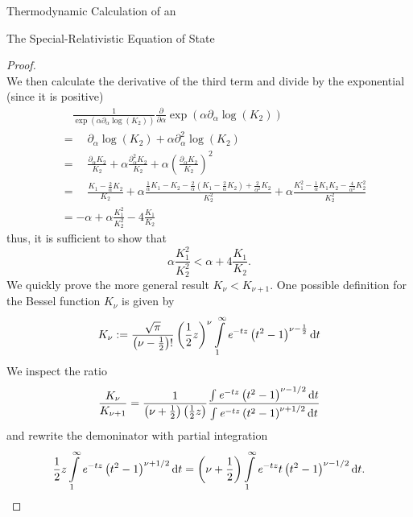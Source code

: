 \begin{section}{Thermodynamic Calculation of an }
\begin{subsection}{The Special-Relativistic Equation of State}
\begin{proof}
\begin{equation}
		\label{2-IntEner-BesselDerivative}
	\end{equation}
	We then calculate the derivative of the third term and divide by the exponential (since it is positive)
	\begin{align}
		&\hspace{1em} \frac{1}{\exp(\alpha\partial_\alpha\log(K_2))}\frac{\partial}{\partial\alpha}\exp(\alpha\partial_\alpha\log(K_2))\\
		&= \hspace{1em} \partial_\alpha\log(K_2) + \alpha\partial^2_\alpha\log(K_2)\\
		&= \hspace{1em} \frac{\partial_\alpha K_2}{K_2} + \alpha\frac{\partial^2_\alpha K_2}{K_2} + \alpha\left(\frac{\partial_\alpha K_2}{K_2}\right)^2\\
		&= \hspace{1em} \frac{K_1-\frac{2}{\alpha}K_2}{K_2} + \alpha\frac{\frac{1}{\alpha}K_1-K_2-\frac{2}{\alpha}\left(K_1-\frac{2}{\alpha}K_2\right)+\frac{2}{\alpha^2}K_2}{K_2^2} + \alpha\frac{K_1^2-\frac{1}{\alpha}K_1K_2-\frac{4}{\alpha^2}K_2^2}{K_2^2}\\
		&= -\alpha + \alpha\frac{K_1^2}{K_2^2} - 4\frac{K_1}{K_2}
	\end{align}
	thus, it is sufficient to show that
	\begin{equation}
		\alpha\frac{K_1^2}{K_2^2}  < \alpha + 4\frac{K_1}{K_2}.
	\end{equation}
	We quickly prove the more general result $K_\nu<K_{\nu+1}$.
	One possible definition \cite{abramowitzPocketbookMathematicalFunctions1984} for the Bessel function $K_\nu$ is given by
	\begin{equation}
		K_\nu := \frac{\sqrt{\pi}}{\left(\nu-\frac{1}{2}\right)!}\left(\frac{1}{2}z\right)^\nu\int\limits_1^\infty\mathit{e}^{-tz}\left(t^2-1\right)^{\nu-\frac{1}{2}}\mathop{}\!\mathrm{d} t
	\end{equation}
	We inspect the ratio
	\begin{equation}
		\frac{K_\nu}{K_{\nu+1}} = \frac{1}{\left(\nu+\frac{1}{2}\right)\left(\frac{1}{2}z\right)}\frac{\int\mathit{e}^{-tz}\left(t^2-1\right)^{\nu-1/2}\mathop{}\!\mathrm{d} t}{\int\mathit{e}^{-tz}\left(t^2-1\right)^{\nu+1/2}\mathop{}\!\mathrm{d} t}
	\end{equation}
	and rewrite the demoninator with partial integration
	\begin{equation}
		 \frac{1}{2}z\int\limits_1^\infty\mathit{e}^{-tz}\left(t^2-1\right)^{\nu+1/2}\mathop{}\!\mathrm{d} t = \left(\nu+\frac{1}{2}\right)\int\limits_1^\infty \mathit{e}^{-tz}t\left(t^2-1\right)^{\nu-1/2}\mathop{}\!\mathrm{d} t.
	\end{equation}

\end{proof}
\end{subsection}
\end{section}
